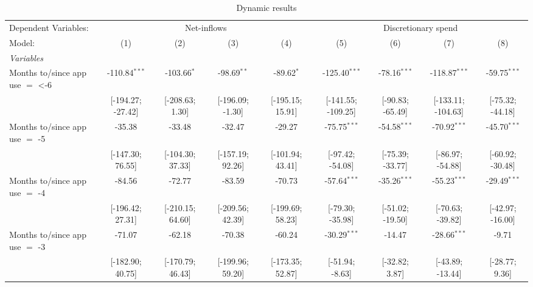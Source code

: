 
\begin{table}[htbp]
   \centering
   \tiny
   \begin{threeparttable}[b]
      \caption{\label{tab:reg_dynamic} Dynamic results}
      \begin{tabular}{lcccccccc}
         \tabularnewline \midrule \midrule
         Dependent Variables: & \multicolumn{4}{c}{Net-inflows} & \multicolumn{4}{c}{Discretionary spend}\\
         Model:                          & (1)               & (2)               & (3)               & (4)               & (5)                & (6)              & (7)                & (8)\\  
         \midrule
         \emph{Variables}\\
         Months to/since app use $=$ <-6 & -110.84$^{***}$   & -103.66$^{*}$     & -98.69$^{**}$     & -89.62$^{*}$      & -125.40$^{***}$    & -78.16$^{***}$   & -118.87$^{***}$    & -59.75$^{***}$\\   
                                         & [-194.27; -27.42] & [-208.63; 1.30]   & [-196.09; -1.30]  & [-195.15; 15.91]  & [-141.55; -109.25] & [-90.83; -65.49] & [-133.11; -104.63] & [-75.32; -44.18]\\   
         Months to/since app use $=$ -5  & -35.38            & -33.48            & -32.47            & -29.27            & -75.75$^{***}$     & -54.58$^{***}$   & -70.92$^{***}$     & -45.70$^{***}$\\   
                                         & [-147.30; 76.55]  & [-104.30; 37.33]  & [-157.19; 92.26]  & [-101.94; 43.41]  & [-97.42; -54.08]   & [-75.39; -33.77] & [-86.97; -54.88]   & [-60.92; -30.48]\\   
         Months to/since app use $=$ -4  & -84.56            & -72.77            & -83.59            & -70.73            & -57.64$^{***}$     & -35.26$^{***}$   & -55.23$^{***}$     & -29.49$^{***}$\\   
                                         & [-196.42; 27.31]  & [-210.15; 64.60]  & [-209.56; 42.39]  & [-199.69; 58.23]  & [-79.30; -35.98]   & [-51.02; -19.50] & [-70.63; -39.82]   & [-42.97; -16.00]\\   
         Months to/since app use $=$ -3  & -71.07            & -62.18            & -70.38            & -60.24            & -30.29$^{***}$     & -14.47           & -28.66$^{***}$     & -9.71\\   
                                         & [-182.90; 40.75]  & [-170.79; 46.43]  & [-199.96; 59.20]  & [-173.35; 52.87]  & [-51.94; -8.63]    & [-32.82; 3.87]   & [-43.89; -13.44]   & [-28.77; 9.36]\\   

\end{tabular}
\end{threeparttable}
\end{table}
